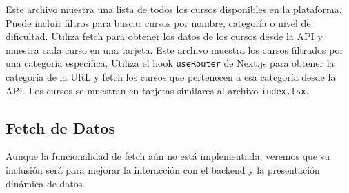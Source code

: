 Este archivo muestra una lista de todos los cursos disponibles en la plataforma. Puede incluir filtros para buscar cursos por nombre, categoría o nivel de dificultad. Utiliza fetch para obtener los datos de los cursos desde la API y muestra cada curso en una tarjeta.
\singlespacing
Este archivo muestra los cursos filtrados por una categoría específica. Utiliza el hook \texttt{useRouter} de Next.js para obtener la categoría de la URL y fetch los cursos que pertenecen a esa categoría desde la API. Los cursos se muestran en tarjetas similares al archivo \texttt{index.tsx}.

\subsection{Fetch de Datos}
Aunque la funcionalidad de fetch aún no está implementada, veremos que su inclusión será para mejorar la interacción con el backend y la presentación dinámica de datos.

